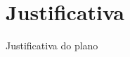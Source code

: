 \section{Justificativa}
\label{sec:architecture}

\begin{large}
  Justificativa do plano
\end{large}
